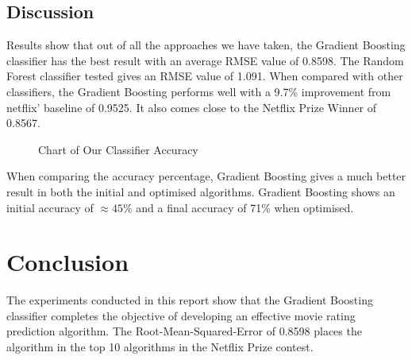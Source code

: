 \documentclass{report}
\begin{document}
	\section{Discussion}
	Results show that out of all the approaches we have taken, the Gradient Boosting classifier has the best result with an average RMSE value of 0.8598. The Random Forest classifier tested gives an RMSE value of 1.091. When compared with other classifiers, the Gradient Boosting performs well with a 9.7\% improvement from netflix’ baseline of 0.9525. It also comes close to the Netflix Prize Winner of 0.8567.
	
	\begin{figure}[H]
		\centering
		\caption{Chart of Our Classifier Accuracy}
		\label{fig:graphofours}
	\end{figure}
	
	When comparing the accuracy percentage, Gradient Boosting gives a much better result in both the initial and optimised algorithms. Gradient Boosting shows an initial accuracy of $\approx45\%$ and a final accuracy of 71\% when optimised.
	
	\chapter{Conclusion}
	The experiments conducted in this report show that the Gradient Boosting classifier completes the objective of developing an effective movie rating prediction algorithm. The Root-Mean-Squared-Error of 0.8598 places the algorithm in the top 10 algorithms in the Netflix Prize contest.
	
\end{document}
